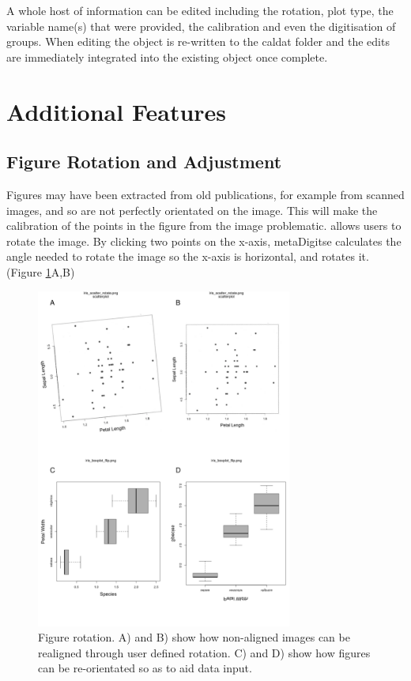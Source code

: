 \documentclass[article]{jss}
\newcommand{\fct}[1]{\code{#1()}}
\begin{document}
A whole host of information can be edited including the rotation, plot type, the variable name(s) that were provided, the calibration and even the digitisation of groups. When editing the  object is re-written to the caldat folder and the edits are immediately integrated into the existing object once complete. 


\section{Additional Features}

\subsection{Figure Rotation and Adjustment}
Figures may have been extracted from old publications, for example from scanned images, and so are not perfectly orientated on the image. This will make the calibration of the points in the figure from the image problematic. \fct{metaDigitise} allows users to rotate the image. By clicking two points on the x-axis, metaDigitse calculates the angle needed to rotate the image so the x-axis is horizontal, and rotates it. (Figure \ref{fig:rotate}A,B)

\begin{figure}[!b] 
\centering
 \includegraphics[width=0.75\textwidth]{fig_rotate.pdf} 
 \caption{Figure rotation. A) and B) show how non-aligned images can be realigned through user defined rotation. C) and D) show how figures can be re-orientated so as to aid data input.}
\label{fig:rotate}
\end{figure}
\end{document}
